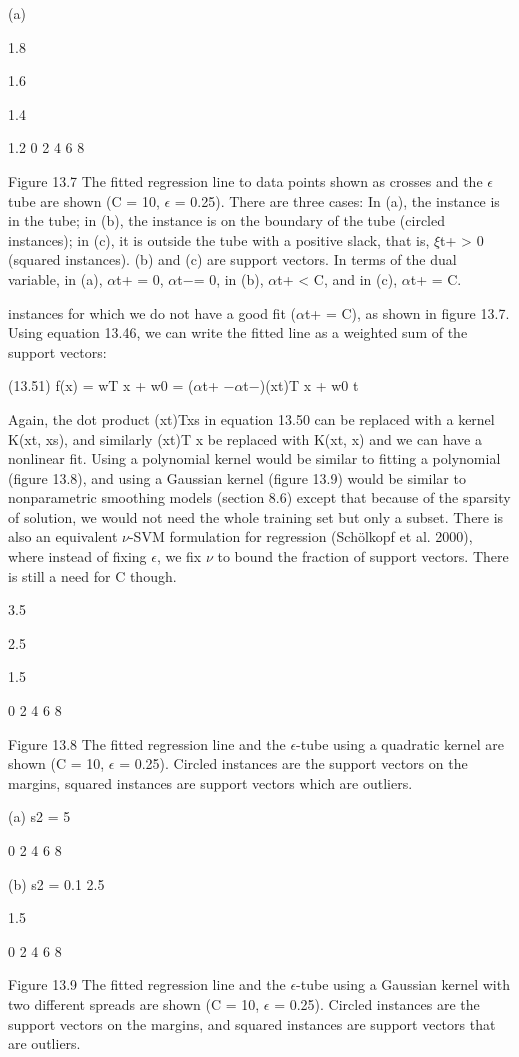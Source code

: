 (a)

1.8

1.6

1.4

1.2 0 2 4 6 8

Figure 13.7 The fitted regression line to data points shown as crosses and the $\epsilon$tube are shown (C = 10, $\epsilon$ = 0.25). There are three cases: In (a), the instance is in the tube; in (b), the instance is on the boundary of the tube (circled instances); in (c), it is outside the tube with a positive slack, that is, $\xi$t+ > 0 (squared instances). (b) and (c) are support vectors. In terms of the dual variable, in (a), $\alpha$t+ = 0, $\alpha$t$-$= 0, in (b), $\alpha$t+ < C, and in (c), $\alpha$t+ = C.

instances for which we do not have a good fit ($\alpha$t+ = C), as shown in figure 13.7. Using equation 13.46, we can write the fitted line as a weighted sum of the support vectors:

(13.51) f(x) = wT x + w0 = ($\alpha$t+ $-$$\alpha$t$-$)(xt)T x + w0 t

Again, the dot product (xt)Txs in equation 13.50 can be replaced with a kernel K(xt, xs), and similarly (xt)T x be replaced with K(xt, x) and we can have a nonlinear fit. Using a polynomial kernel would be similar to fitting a polynomial (figure 13.8), and using a Gaussian kernel (figure 13.9) would be similar to nonparametric smoothing models (section 8.6) except that because of the sparsity of solution, we would not need the whole training set but only a subset. There is also an equivalent $\nu$-SVM formulation for regression (Schölkopf et al. 2000), where instead of fixing $\epsilon$, we fix $\nu$ to bound the fraction of support vectors. There is still a need for C though.

3.5

2.5

1.5

0 2 4 6 8

Figure 13.8 The fitted regression line and the $\epsilon$-tube using a quadratic kernel are shown (C = 10, $\epsilon$ = 0.25). Circled instances are the support vectors on the margins, squared instances are support vectors which are outliers.

(a) s2 = 5

0 2 4 6 8

(b) s2 = 0.1 2.5

1.5

0 2 4 6 8

Figure 13.9 The fitted regression line and the $\epsilon$-tube using a Gaussian kernel with two different spreads are shown (C = 10, $\epsilon$ = 0.25). Circled instances are the support vectors on the margins, and squared instances are support vectors that are outliers.

